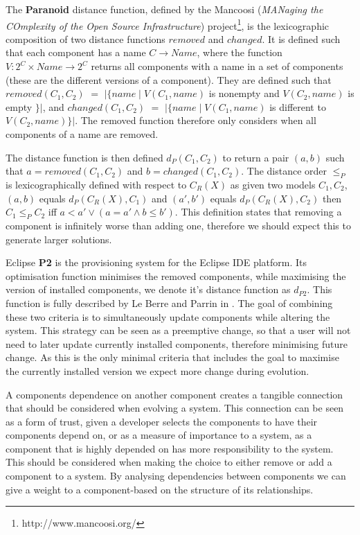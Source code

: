 The \textbf{Paranoid} distance function, 
defined by the Mancoosi (\textit{MANaging the COmplexity of the Open Source Infrastructure}) project\footnote{http://www.mancoosi.org/}, 
is the lexicographic composition of two distance functions $removed$ and $changed$.
It is defined such that each component has a name $C \rightarrow Name$,
where the function $V: 2^C \times Name \rightarrow 2^C$ returns all components with a name in a set of components 
(these are the different versions of a component).
They are defined such that $removed(C_1,C_2)$ $=$ $|\{name \mid V(C_1,name) $ is nonempty and $V(C_2,name)$ is empty $\}|$,
and $changed(C_1,C_2)$ $=$ $|\{name \mid V(C_1,name)$ is different to $V(C_2,name)\}|$.
The removed function therefore only considers when all components of a name are removed. 

The distance function is then defined $d_P(C_1,C_2)$ to return a pair $(a,b)$ such that $a = removed(C_1,C_2)$ and $b = changed(C_1,C_2)$.
The distance order $\leq_{P}$ is lexicographically defined with respect to $C_R(X)$ as given two models $C_1,C_2$,
$(a,b)$ equals $d_P(C_R(X),C_1)$ and $(a',b')$ equals $d_P(C_R(X),C_2)$ then
$C_1 \leq_{P} C_2 $ iff $a < a' \vee (a = a' \wedge b \leq b')$.
This definition states that removing a component is infinitely worse than adding one, 
therefore we should expect this to generate larger solutions.

Eclipse \textbf{P2} \cite{le_berre_dependency_2009,leBerre2010} is the provisioning system for the Eclipse IDE platform.
Its optimisation function minimises the removed components, while maximising the version of installed components, 
we denote it's distance function as $d_{P2}$.
This function is fully described by Le Berre and Parrin in \cite{leBerre2010}.
The goal of combining these two criteria is to simultaneously update components while altering the system.
This strategy can be seen as a preemptive change, so that a user will not need to later update currently installed components,
therefore minimising future change.
As this is the only minimal criteria that includes the goal to maximise the currently installed version 
we expect more change during evolution.

A components dependence on another component creates a tangible connection that should be considered when evolving a system.
This connection can be seen as a form of trust, given a developer selects the components to have their components depend on,
or as a measure of importance to a system, as a component that is highly depended on has more responsibility to the system.
This should be considered when making the choice to either remove or add a component to a system.
By analysing dependencies between components we can give a weight to a component-based on the structure of its relationships.

